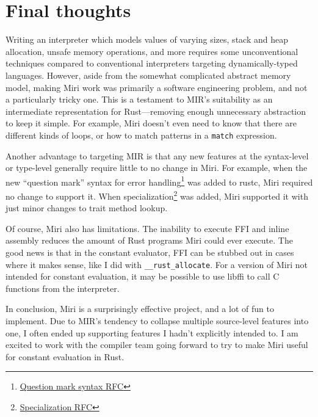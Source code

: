 \documentclass[twocolumn]{article}
\newcommand{\rust}[1]{\texttt{#1}}
\begin{document}

\section{Final thoughts}

Writing an interpreter which models values of varying sizes, stack and heap allocation, unsafe
memory operations, and more requires some unconventional techniques compared to conventional
interpreters targeting dynamically-typed languages. However, aside from the somewhat complicated
abstract memory model, making Miri work was primarily a software engineering problem, and not a
particularly tricky one. This is a testament to MIR's suitability as an intermediate representation
for Rust---removing enough unnecessary abstraction to keep it simple. For example, Miri doesn't even
need to know that there are different kinds of loops, or how to match patterns in a \rust{match}
expression.

Another advantage to targeting MIR is that any new features at the syntax-level or type-level
generally require little to no change in Miri. For example, when the new ``question mark'' syntax
for error handling\footnote{
  \href{https://github.com/rust-lang/rfcs/blob/master/text/0243-trait-based-exception-handling.md}
    {Question mark syntax RFC}}
was added to rustc, Miri required no change to support it.
When specialization\footnote{
  \href{https://github.com/rust-lang/rfcs/blob/master/text/1210-impl-specialization.md}
    {Specialization RFC}}
was added, Miri supported it with just minor changes to trait method lookup.

Of course, Miri also has limitations. The inability to execute FFI and inline assembly reduces the
amount of Rust programs Miri could ever execute. The good news is that in the constant evaluator,
FFI can be stubbed out in cases where it makes sense, like I did with \rust{__rust_allocate}. For a
version of Miri not intended for constant evaluation, it may be possible to use libffi to call C
functions from the interpreter.

In conclusion, Miri is a surprisingly effective project, and a lot of fun to implement. Due to MIR's
tendency to collapse multiple source-level features into one, I often ended up supporting features I
hadn't explicitly intended to. I am excited to work with the compiler team going forward to try to
make Miri useful for constant evaluation in Rust.
\end{document}
